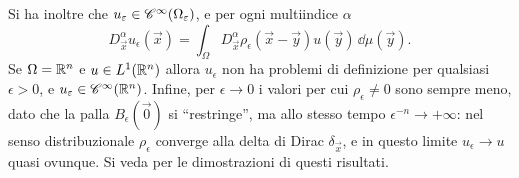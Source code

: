 Si ha inoltre che $u_\epsilon\in\cont[\infty]{\Omega_\epsilon}$, e per ogni multiindice $\alpha$
\begin{equation}
    D_{\vec x}^\alpha u_\epsilon(\vec x)=\int_\Omega D_{\vec x}^\alpha\rho_\epsilon(\vec x-\vec y)u(\vec y)\,\dd\mu(\vec y).
\end{equation}
Se $\Omega=\R^n$ e $u\in\leb[1]{\R^n}$ allora $u_\epsilon$ non ha problemi di definizione per qualsiasi $\epsilon>0$, e $u_\epsilon\in\cont[\infty]{\R^n}$.
Infine, per $\epsilon\to 0$ i valori per cui $\rho_\epsilon\ne 0$ sono sempre meno, dato che la palla $B_\epsilon(\vec 0)$ si ``restringe'', ma allo stesso tempo $\epsilon^{-n}\to+\infty$: nel senso distribuzionale $\rho_\epsilon$ converge alla delta di Dirac $\delta_{\vec x}$, e in questo limite $u_\epsilon\to u$ quasi ovunque.
Si veda \cite[p.~630]{evans} per le dimostrazioni di questi risultati.

